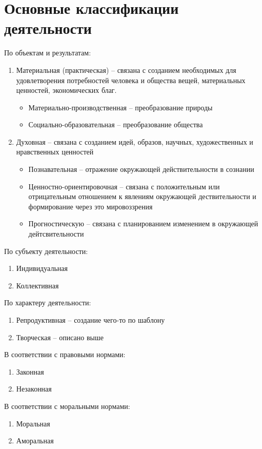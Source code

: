 \documentclass[12pt,a4paper]{book}
\begin{document}
\section{Основные классификации деятельности}
По объектам и результатам:
\begin{enumerate}
	\item Материальная (практическая) -- связана с созданием необходимых для удовлетворения потребностей человека и общества вещей, материальных ценностей, экономических благ.
	\begin{itemize}
		\item Материально-производственная -- преобразование природы
		\item Социально-образовательная -- преобразование общества
	\end{itemize}
	\item Духовная -- связана с созданием идей, образов, научных, художественных и нравственных ценностей 
	\begin{itemize}
		\item Познавательная -- отражение окружающей действительности в сознании
		\item Ценностно-ориентировочная -- связана с положительным или отрицательным отношением к явлениям окружающей дествительности и формирование через это мировоззрения
		\item Прогностическую -- связана с планированием изменением в окружающей дейтсвительности
	\end{itemize}
\end{enumerate}

По субъекту деятельности:
\begin{enumerate}
	\item Индивидуальная 
	\item Коллективная 
\end{enumerate}

По характеру деятельности:
\begin{enumerate}
	\item Репродуктивная -- создание чего-то по шаблону
	\item Творческая -- описано выше
\end{enumerate}

В соответствии с правовыми нормами:
\begin{enumerate}
	\item Законная
	\item Незаконная
\end{enumerate}

В соответствии с моральными нормами:
\begin{enumerate}
	\item Моральная
	\item Аморальная
\end{enumerate}
\end{document}
